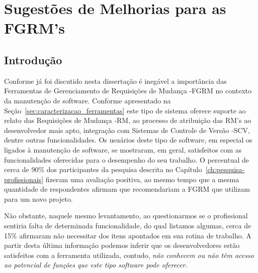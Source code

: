 \chapter{Sugestões de Melhorias para as FGRM's}
\label{ch:sug_melhoria}

\section{Introdução}
\label{sec:sug_melhoria_intro}

Conforme já foi discutido nesta dissertação é inegável a importância das
Ferramentas de Gerenciamento de Requisições de Mudança \@-\@ FGRM no contexto da
manutenção de software. Conforme apresentado na
Seção~\ref{sec:caracterizacao_ferramentas} este tipo de sistema oferece suporte
ao relato das Requisições de Mudança \@-\@ RM, ao processo de atribuição das
RM's ao desenvolvedor mais apto, integração com Sistemas de Controle de Versão
\@-\@ SCV, dentre outras funcionalidades. Os usuários deste tipo de software, em
especial os ligados à manutenção de software, se mostraram, em geral,
satisfeitos com as funcionalidades oferecidas para o desempenho do seu trabalho.
O percentual de cerca de 90\% dos par\-ti\-ci\-pan\-tes da pesquisa descrita no
Capítulo~\ref{ch:pesquisa-profissionais} fizeram uma avaliação positiva, ao
mesmo tempo que a mesma quantidade de respondentes afirmam que recomendariam a
FGRM que utilizam para um novo projeto.

Não obstante, naquele mesmo levantamento, ao questionarmos se o profissional
sentiria falta de determinada funcionalidade, do qual listamos algumas, cerca de
15\% afirmaram não necessitar dos itens apontados em sua rotina de trabalho. A
partir desta última informação podemos inferir que os desenvolvedores estão
satisfeitos com a ferramenta utilizada, contudo, \textit{não conhecem ou não têm
	acesso ao potencial de funções que este tipo software pode oferecer}.

